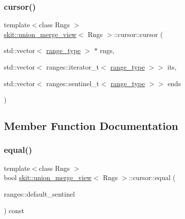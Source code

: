 \subsubsection{\texorpdfstring{cursor()}{cursor()}\hspace{0.1cm}{\footnotesize\ttfamily [2/2]}}
{\footnotesize\ttfamily template$<$class Rngs $>$ \\
\hyperlink{classskit_1_1union__merge__view}{skit\+::union\+\_\+merge\+\_\+view}$<$ Rngs $>$\+::cursor\+::cursor (\begin{DoxyParamCaption}\item[{std\+::vector$<$ \hyperlink{structskit_1_1union__merge__view_1_1cursor_aca3870894a5b4e031b79496118e9ca60}{range\+\_\+type} $>$ $\ast$}]{rngs,  }\item[{std\+::vector$<$ ranges\+::iterator\+\_\+t$<$ \hyperlink{structskit_1_1union__merge__view_1_1cursor_aca3870894a5b4e031b79496118e9ca60}{range\+\_\+type} $>$$>$}]{its,  }\item[{std\+::vector$<$ ranges\+::sentinel\+\_\+t$<$ \hyperlink{structskit_1_1union__merge__view_1_1cursor_aca3870894a5b4e031b79496118e9ca60}{range\+\_\+type} $>$$>$}]{ends }\end{DoxyParamCaption})\hspace{0.3cm}{\ttfamily [inline]}}



\subsection{Member Function Documentation}
\mbox{\label{structskit_1_1union__merge__view_1_1cursor_a664936e54ecbffd658386bc26abcd2a9}} 
\subsubsection{\texorpdfstring{equal()}{equal()}}
{\footnotesize\ttfamily template$<$class Rngs $>$ \\
bool \hyperlink{classskit_1_1union__merge__view}{skit\+::union\+\_\+merge\+\_\+view}$<$ Rngs $>$\+::cursor\+::equal (\begin{DoxyParamCaption}\item[{ranges\+::default\+\_\+sentinel}]{ }\end{DoxyParamCaption}) const\hspace{0.3cm}{\ttfamily [inline]}}

